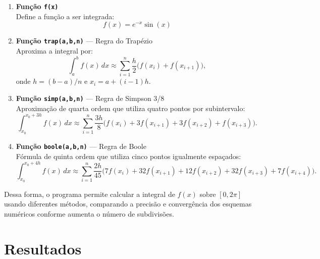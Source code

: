 \begin{enumerate}
    \item \textbf{Função \texttt{f(x)}} \\
    Define a função a ser integrada:
    \begin{equation}
        f(x) = e^{-x} \sin(x)
    \end{equation}

    \item \textbf{Função \texttt{trap(a,b,n)}} — Regra do Trapézio \\
    Aproxima a integral por:
    \begin{equation}
        \int_a^b f(x)\,dx \approx \sum_{i=1}^{n} \frac{h}{2}\Big(f(x_i)+f(x_{i+1})\Big),
    \end{equation}
    onde $h = (b-a)/n$ e $x_i = a + (i-1)h$.

    \item \textbf{Função \texttt{simp(a,b,n)}} — Regra de Simpson 3/8 \\
    Aproximação de quarta ordem que utiliza quatro pontos por subintervalo:
    \begin{equation}
        \int_{x_0}^{x_0+3h} f(x)\,dx \approx \sum_{i=1}^{n} \frac{3h}{8} \Big(f(x_i) + 3f(x_{i+1}) + 3f(x_{i+2}) + f(x_{i+3})\Big).
    \end{equation}

    \item \textbf{Função \texttt{boole(a,b,n)}} — Regra de Boole \\
    Fórmula de quinta ordem que utiliza cinco pontos igualmente espaçados:
    \begin{equation}
        \int_{x_0}^{x_0+4h} f(x)\,dx \approx \sum_{i=1}^{n} \frac{2h}{45} \Big( 7f(x_i) + 32f(x_{i+1}) + 12f(x_{i+2}) + 32f(x_{i+3}) + 7f(x_{i+4}) \Big).
    \end{equation}
\end{enumerate}

\noindent
Dessa forma, o programa permite calcular a integral de $f(x)$ sobre 
$[0,2\pi]$ usando diferentes métodos, comparando a precisão e convergência 
dos esquemas numéricos conforme aumenta o número de subdivisões.

\section*{Resultados}



